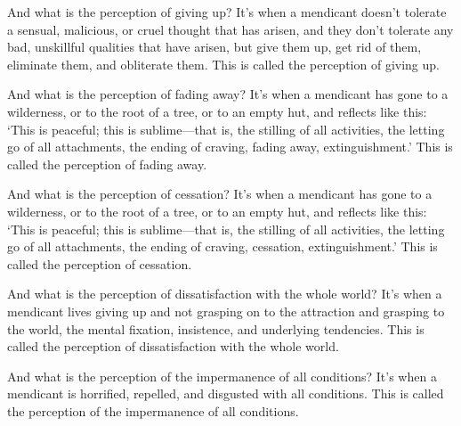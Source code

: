 \documentclass[12pt,openany]{book}%
\begin{document}
And what is the perception of giving up? It’s when a mendicant doesn’t tolerate a sensual, malicious, or cruel thought that has arisen, and they don’t tolerate any bad, unskillful qualities that have arisen, but give them up, get rid of them, eliminate them, and obliterate them. This is called the perception of giving up. 

And what is the perception of fading away? It’s when a mendicant has gone to a wilderness, or to the root of a tree, or to an empty hut, and reflects like this: ‘This is peaceful; this is sublime—that is, the stilling of all activities, the letting go of all attachments, the ending of craving, fading away, extinguishment.’ This is called the perception of fading away. 

And what is the perception of cessation? It’s when a mendicant has gone to a wilderness, or to the root of a tree, or to an empty hut, and reflects like this: ‘This is peaceful; this is sublime—that is, the stilling of all activities, the letting go of all attachments, the ending of craving, cessation, extinguishment.’ This is called the perception of cessation. 

And what is the perception of dissatisfaction with the whole world? It’s when a mendicant lives giving up and not grasping on to the attraction and grasping to the world, the mental fixation, insistence, and underlying tendencies. This is called the perception of dissatisfaction with the whole world. 

And what is the perception of the impermanence of all conditions? It’s when a mendicant is horrified, repelled, and disgusted with all conditions. This is called the perception of the impermanence of all conditions. 
\end{document}
